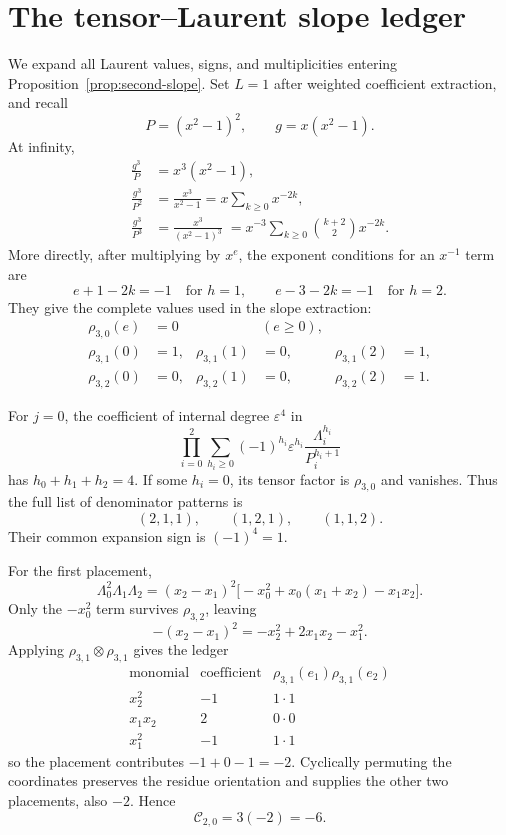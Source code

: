 \documentclass[11pt]{article}
\theoremstyle{definition}
\begin{document}
\section{The tensor--Laurent slope ledger}
\label{app:second-slope}

We expand all Laurent values, signs, and multiplicities entering Proposition~\ref{prop:second-slope}. Set $L=1$ after weighted coefficient extraction, and recall
\[
P=(x^2-1)^2,
\qquad
g=x(x^2-1).
\]
At infinity,
\begin{align*}
\frac{g^3}{P}
&=x^3(x^2-1),\\
\frac{g^3}{P^2}
&=\frac{x^3}{x^2-1}
=x\sum_{k\ge0}x^{-2k},\\
\frac{g^3}{P^3}
&=\frac{x^3}{(x^2-1)^3}
\;=x^{-3}\sum_{k\ge0}\binom{k+2}{2}x^{-2k}.
\end{align*}
More directly, after multiplying by $x^e$, the exponent conditions for an $x^{-1}$ term are
\[
e+1-2k=-1
\quad\text{for }h=1,
\qquad
e-3-2k=-1
\quad\text{for }h=2.
\]
They give the complete values used in the slope extraction:
\begin{align*}
\rho_{3,0}(e)&=0 &&(e\ge0),\\
\rho_{3,1}(0)&=1,&
\rho_{3,1}(1)&=0,&
\rho_{3,1}(2)&=1,\\
\rho_{3,2}(0)&=0,&
\rho_{3,2}(1)&=0,&
\rho_{3,2}(2)&=1.
\end{align*}

For $j=0$, the coefficient of internal degree $\varepsilon^4$ in
\[
\prod_{i=0}^2
\sum_{h_i\ge0}(-1)^{h_i}\varepsilon^{h_i}
\frac{\Lambda_i^{h_i}}{P_i^{h_i+1}}
\]
has $h_0+h_1+h_2=4$. If some $h_i=0$, its tensor factor is $\rho_{3,0}$ and vanishes. Thus the full list of denominator patterns is
\[
(2,1,1),
\qquad
(1,2,1),
\qquad
(1,1,2).
\]
Their common expansion sign is $(-1)^4=1$.

For the first placement,
\[
\Lambda_0^2\Lambda_1\Lambda_2
=(x_2-x_1)^2
\bigl[-x_0^2+x_0(x_1+x_2)-x_1x_2\bigr].
\]
Only the $-x_0^2$ term survives $\rho_{3,2}$, leaving
\[
-(x_2-x_1)^2
=-x_2^2+2x_1x_2-x_1^2.
\]
Applying $\rho_{3,1}\otimes\rho_{3,1}$ gives the ledger
\begin{equation}
\begin{array}{c|c|c}
\text{monomial}&\text{coefficient}&
\rho_{3,1}(e_1)\rho_{3,1}(e_2)\\ \hline
x_2^2&-1&1\cdot1\\
x_1x_2&2&0\cdot0\\
x_1^2&-1&1\cdot1
\end{array}
\label{eq:appB-one-placement}
\end{equation}
so the placement contributes $-1+0-1=-2$. Cyclically permuting the coordinates preserves the residue orientation and supplies the other two placements, also $-2$. Hence
\[
\mathcal C_{2,0}=3(-2)=-6.
\]
\end{document}
